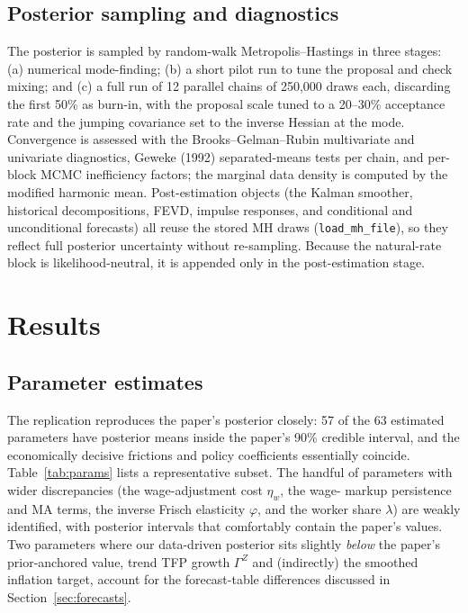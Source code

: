 \documentclass[11pt]{article}
\theoremstyle{definition}
\begin{document}
\subsection{Posterior sampling and diagnostics}
The posterior is sampled by random-walk Metropolis--Hastings in three stages: (a) numerical
mode-finding; (b) a short pilot run to tune the proposal and check mixing; and (c) a full run of 12
parallel chains of 250{,}000 draws each, discarding the first 50\% as burn-in, with the proposal scale
tuned to a 20--30\% acceptance rate and the jumping covariance set to the inverse Hessian at the mode.
Convergence is assessed with the Brooks--Gelman--Rubin multivariate and univariate diagnostics, Geweke
(1992) separated-means tests per chain, and per-block MCMC inefficiency factors; the marginal data
density is computed by the modified harmonic mean. Post-estimation objects (the Kalman smoother,
historical decompositions, FEVD, impulse responses, and conditional and unconditional forecasts) all
reuse the stored MH draws (\texttt{load\_mh\_file}), so they reflect full posterior uncertainty without
re-sampling. Because the natural-rate block is likelihood-neutral, it is appended only in the
post-estimation stage.

\section{Results}\label{sec:results}

\subsection{Parameter estimates}
The replication reproduces the paper's posterior closely: 57 of the 63 estimated parameters have
posterior means inside the paper's 90\% credible interval, and the economically decisive
frictions and policy coefficients essentially coincide. Table~\ref{tab:params} lists a representative
subset. The handful of parameters with wider discrepancies (the wage-adjustment cost $\eta_w$, the wage-
markup persistence and MA terms, the inverse Frisch elasticity $\varphi$, and the worker share $\lambda$)
are weakly identified, with posterior intervals that comfortably contain the paper's values. Two
parameters where our data-driven posterior sits slightly \emph{below} the paper's prior-anchored value, trend TFP growth $\Gamma^Z$ and (indirectly) the smoothed inflation target, account for the
forecast-table differences discussed in Section~\ref{sec:forecasts}.
\end{document}
